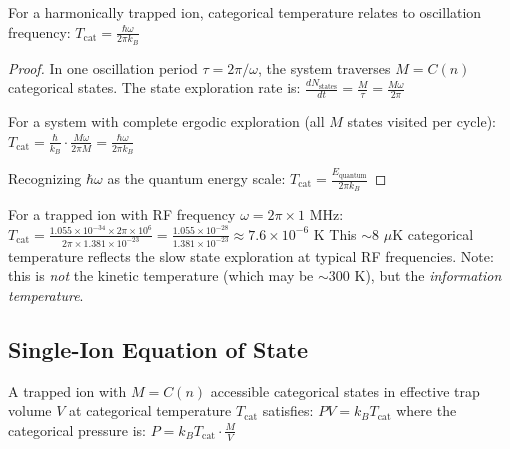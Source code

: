\begin{proposition}
\label{prop:tempfreq}
For a harmonically trapped ion, categorical temperature relates to oscillation frequency:
$
T_{\mathrm{cat}} = \frac{\hbar \omega}{2\pi k_B}
$
\end{proposition}

\begin{proof}
In one oscillation period $\tau = 2\pi/\omega$, the system traverses $M = C(n)$ categorical states. The state exploration rate is:
$
\frac{dN_{\mathrm{states}}}{dt} = \frac{M}{\tau} = \frac{M\omega}{2\pi}
$

For a system with complete ergodic exploration (all $M$ states visited per cycle):
$
T_{\mathrm{cat}} = \frac{\hbar}{k_B} \cdot \frac{M\omega}{2\pi M} = \frac{\hbar\omega}{2\pi k_B}
$

Recognizing $\hbar\omega$ as the quantum energy scale:
$
T_{\mathrm{cat}} = \frac{E_{\mathrm{quantum}}}{2\pi k_B}
$
\end{proof}

\begin{example}
\label{ex:paul_temp}
For a trapped ion with RF frequency $\omega = 2\pi \times 1$ MHz:
$
T_{\mathrm{cat}} = \frac{1.055 \times 10^{-34} \times 2\pi \times 10^6}{2\pi \times 1.381 \times 10^{-23}} = \frac{1.055 \times 10^{-28}}{1.381 \times 10^{-23}} \approx 7.6 \times 10^{-6} \text{ K}
$
This $\sim 8$ $\mu$K categorical temperature reflects the slow state exploration at typical RF frequencies. Note: this is \emph{not} the kinetic temperature (which may be $\sim 300$ K), but the \emph{information temperature}.
\end{example}

\subsection{Single-Ion Equation of State}

\begin{theorem}
\label{thm:ideal}
A trapped ion with $M = C(n)$ accessible categorical states in effective trap volume $V$ at categorical temperature $T_{\mathrm{cat}}$ satisfies:
$
PV = k_B T_{\mathrm{cat}}
$
where the categorical pressure is:
$
P = k_B T_{\mathrm{cat}} \cdot \frac{M}{V}
$
\end{theorem}

